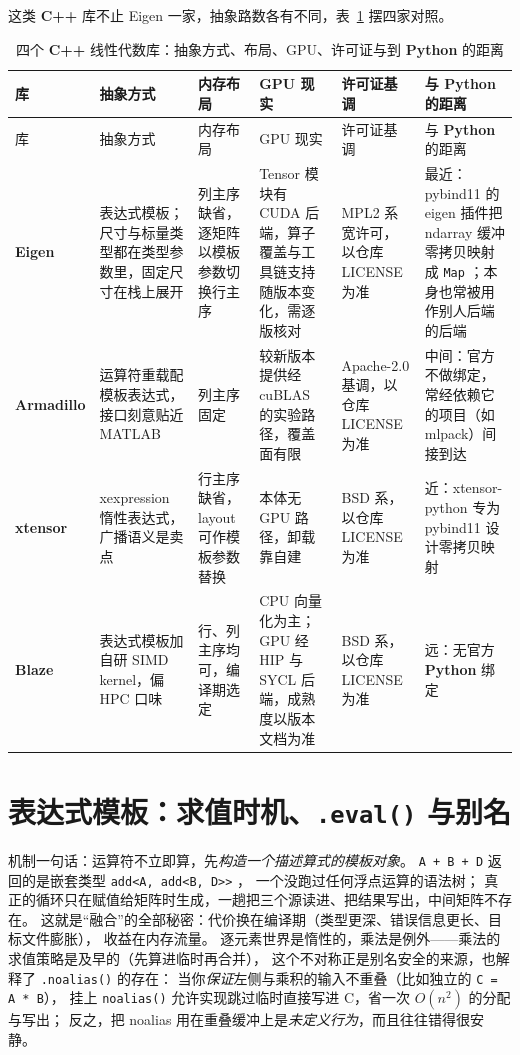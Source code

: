 \documentclass[12pt,a4paper,fontset=fandol]{ctexbook}
\newcommand{\Tp}[1]{\texttt{#1}}
\newcommand{\Bk}{\allowbreak}
\newcommand{\Lib}[1]{\textbf{#1}}
\newcommand{\Lang}[1]{\textsf{\bfseries #1}}
\newcommand{\CPP}{\Lang{C++}}
\newcommand{\PY}{\Lang{Python}}
\begin{document}
这类 \CPP{} 库不止 Eigen 一家，抽象路数各有不同，表~\ref{tab:ch05-cpplibs} 摆四家对照。

\begin{longtable}{@{}>{\raggedright\arraybackslash}p{}
  >{\raggedright\arraybackslash}p{}
  >{\raggedright\arraybackslash}p{}
  >{\raggedright\arraybackslash}p{}
  >{\raggedright\arraybackslash}p{}
  >{\raggedright\arraybackslash}p{}@{}}
\caption{四个 \CPP{} 线性代数库：抽象方式、布局、GPU、许可证与到 \PY{} 的距离}\label{tab:ch05-cpplibs}\\
\toprule
库 & 抽象方式 & 内存布局 & GPU 现实 & 许可证基调 & 与 \PY{} 的距离 \\
\midrule
\endfirsthead
\toprule
库 & 抽象方式 & 内存布局 & GPU 现实 & 许可证基调 & 与 \PY{} 的距离 \\
\midrule
\endhead
\Lib{Eigen} & 表达式模板；尺寸与标量类型都在类型参数里，固定尺寸在栈上展开 &
  列主序缺省，逐矩阵以模板参数切换行主序 &
  Tensor 模块有 CUDA 后端，算子覆盖与工具链支持随版本变化，需逐版核对 &
  MPL2 系宽许可，以仓库 LICENSE 为准 &
  最近：pybind11 的 eigen 插件把 ndarray 缓冲零拷贝映射成 \Tp{Map} \Bk{}；本身也常被用作别人后端的后端 \\
\Lib{Armadillo} & 运算符重载配模板表达式，接口刻意贴近 MATLAB &
  列主序固定 &
  较新版本提供经 cuBLAS 的实验路径，覆盖面有限 &
  Apache-2.0 基调，以仓库 LICENSE 为准 &
  中间：官方不做绑定，常经依赖它的项目（如 mlpack）间接到达 \\
\Lib{xtensor} & xexpression 惰性表达式，广播语义是卖点 &
  行主序缺省，layout 可作模板参数替换 &
  本体无 GPU 路径，卸载靠自建 &
  BSD 系，以仓库 LICENSE 为准 &
  近：xtensor-python 专为 pybind11 设计零拷贝映射 \\
\Lib{Blaze} & 表达式模板加自研 SIMD kernel，偏 HPC 口味 &
  行、列主序均可，编译期选定 &
  CPU 向量化为主；GPU 经 HIP 与 SYCL 后端，成熟度以版本文档为准 &
  BSD 系，以仓库 LICENSE 为准 &
  远：无官方 \PY{} 绑定 \\
\bottomrule
\end{longtable}

\section{表达式模板：求值时机、\Tp{.eval()} 与别名}

机制一句话：运算符不立即算，先\emph{构造一个描述算式的模板对象}。
\Tp{A + B + D} 返回的是嵌套类型 \Tp{add<A, add<B, D>>} \Bk{}，
一个没跑过任何浮点运算的语法树；
真正的循环只在赋值给矩阵时生成，一趟把三个源读进、把结果写出，中间矩阵不存在。
这就是``融合''的全部秘密：代价换在编译期（类型更深、错误信息更长、目标文件膨胀），
收益在内存流量。
逐元素世界是惰性的，乘法是例外——乘法的求值策略是及早的（先算进临时再合并），
这个不对称正是别名安全的来源，也解释了 \Tp{.noalias()} \Bk{} 的存在：
当你\emph{保证}左侧与乘积的输入不重叠（比如独立的 \Tp{C = A * B}），
挂上 \Tp{noalias()} 允许实现跳过临时直接写进 C，省一次 $O(n^2)$ 的分配与写出；
反之，把 noalias 用在重叠缓冲上是\emph{未定义行为}，而且往往错得很安静。
\end{document}

